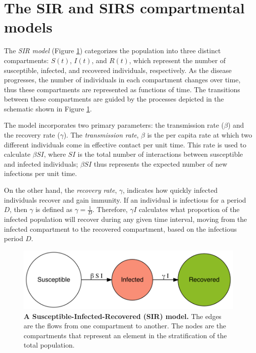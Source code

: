 \documentclass[
11pt, %
oneside, %
english, %
singlespacing, %
]{macthesis} %
\begin{document}
\section{The SIR and SIRS compartmental models}\label{the-sir-and-sirs-compartmental-models}

The \emph{SIR model} (Figure \ref{fig:sir-model}) categorizes the population into three distinct compartments: \(S(t)\), \(I(t)\), and \(R(t)\), which represent the number of susceptible, infected, and recovered individuals, respectively. As the disease progresses, the number of individuals in each compartment changes over time, thus these compartments are represented as functions of time. The transitions between these compartments are guided by the processes depicted in the schematic shown in Figure \ref{fig:sir-model}.

The model incorporates two primary parameters: the transmission rate (\(\beta\)) and the recovery rate (\(\gamma\)). The \emph{transmission rate}, \(\beta\) is the per capita rate at which two different individuals come in effective contact per unit time. This rate is used to calculate \(\beta SI\), where \(SI\) is the total number of interactions between susceptible and infected individuals; \(\beta SI\) thus represents the expected number of new infections per unit time.

On the other hand, the \emph{recovery rate}, \(\gamma\), indicates how quickly infected individuals recover and gain immunity. If an individual is infectious for a period \(D\), then \(\gamma\) is defined as \(\gamma = \frac{1}{D}\). Therefore, \(\gamma I\) calculates what proportion of the infected population will recover during any given time interval, moving from the infected compartment to the recovered compartment, based on the infectious period \(D\).

\begin{figure}[H]
\centering
\includegraphics[width=\textwidth]{figure/sir_model.png}
\caption[Susceptible-Infected-Recovered (SIR) model]{\textbf{A Susceptible-Infected-Recovered (SIR) model.} The edges are the flows from one compartment to another. The nodes are the compartments that represent an element in the stratification of the total population.}
\label{fig:sir-model}
\end{figure}
\end{document}
